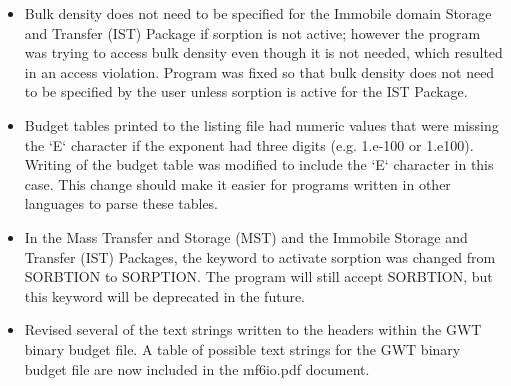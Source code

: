 \documentclass[11pt,twoside,twocolumn]{usgsreport}
\begin{document}
\begin{itemize}
\begin{itemize}
	        \item Bulk density does not need to be specified for the Immobile domain Storage and Transfer (IST) Package if sorption is not active; however the program was trying to access bulk density even though it is not needed, which resulted in an access violation.  Program was fixed so that bulk density does not need to be specified by the user unless sorption is active for the IST Package.
	        \item Budget tables printed to the listing file had numeric values that were missing the `E` character if the exponent had three digits (e.g. 1.e-100 or 1.e100).  Writing of the budget table was modified to include the `E` character in this case.  This change should make it easier for programs written in other languages to parse these tables.
	        \item In the Mass Transfer and Storage (MST) and the Immobile Storage and Transfer (IST) Packages, the keyword to activate sorption was changed from SORBTION to SORPTION.  The program will still accept SORBTION, but this keyword will be deprecated in the future.
	        \item Revised several of the text strings written to the headers within the GWT binary budget file.  A table of possible text strings for the GWT binary budget file are now included in the mf6io.pdf document.
	\end{itemize}



\end{itemize}
\end{document}
